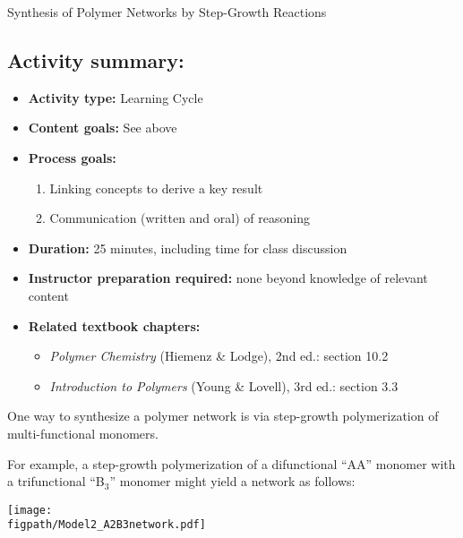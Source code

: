 \begin{activity}[extension]{Synthesis of Polymer Networks by Step-Growth Reactions}
\begin{instructornotes}
	\subsection*{Activity summary:}
	\begin{itemize}
		\item \textbf{Activity type:} Learning Cycle
		\item \textbf{Content goals:} See above
		\item \textbf{Process goals:} %
			\begin{enumerate}
				\item Linking concepts to derive a key result
				\item Communication (written and oral) of reasoning
			\end{enumerate}
		\item \textbf{Duration:} 25 minutes, including time for class discussion
		\item \textbf{Instructor preparation required:} none beyond knowledge of relevant content
		\item \textbf{Related textbook chapters:}
			\begin{itemize}
				\item \emph{Polymer Chemistry} (Hiemenz \& Lodge), 2nd ed.: section 10.2
				\item \emph{Introduction to Polymers} (Young \& Lovell), 3rd ed.: section 3.3
			\end{itemize}
	\end{itemize}
	
\end{instructornotes}

\begin{model}

	One way to synthesize a polymer network is via step-growth polymerization of multi-functional monomers.
	
	For example, a step-growth polymerization of a difunctional ``AA'' monomer with a trifunctional ``B$_3$'' monomer might yield a network as follows:
	
	\centerline{\texttt{[image: \\figpath/Model2\_A2B3network.pdf]}}


\end{model}
\end{activity}
